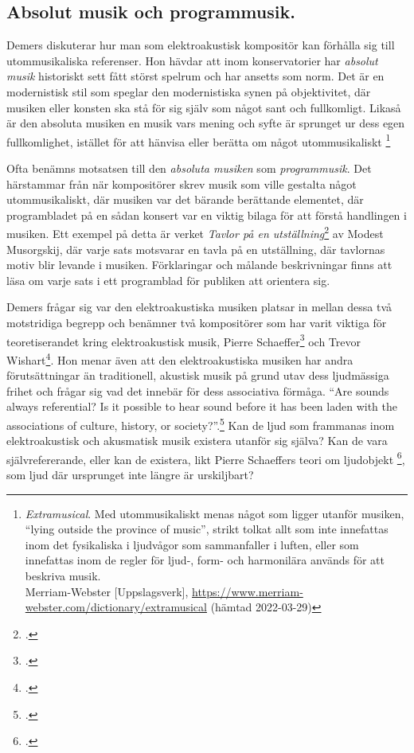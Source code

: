 \documentclass{article}
\begin{document}


\subsection{Absolut musik och programmusik.}
Demers diskuterar hur man som elektroakustisk kompositör kan förhålla sig till utommusikaliska referenser.
Hon hävdar att inom konservatorier har \emph{absolut musik} historiskt sett fått störst spelrum och har ansetts
som norm. Det är en modernistisk stil som speglar den modernistiska synen på objektivitet, där musiken eller
konsten ska stå för sig själv som något sant och fullkomligt. Likaså är den absoluta musiken en musik vars
mening och syfte är sprunget ur dess egen fullkomlighet, istället för att hänvisa eller berätta om något
utommusikaliskt \footnote{\emph{Extramusical}. Med utommusikaliskt menas något som ligger utanför musiken,
``lying outside the province of music'', strikt tolkat allt som inte innefattas inom det fysikaliska i
ljudvågor som sammanfaller i luften, eller som innefattas inom de regler för ljud-, form- och harmonilära
används för att beskriva musik. \\ Merriam-Webster [Uppslagsverk],
\url{https://www.merriam-webster.com/dictionary/extramusical} (hämtad 2022-03-29)}\nocite{webster}

Ofta benämns motsatsen till den \emph{absoluta musiken} som \emph{programmusik}. Det härstammar från när
kompositörer skrev musik som ville gestalta något utommusikaliskt, där musiken var det bärande berättande
elementet, där programbladet på en sådan konsert var en viktig bilaga för att förstå handlingen i musiken.
Ett exempel på detta är verket \emph{Tavlor på en utställning}\footcite{Tavlor} av Modest Musorgskij,
där varje sats motsvarar en tavla på en utställning, där tavlornas motiv blir levande i musiken. Förklaringar
och målande beskrivningar finns att läsa om varje sats i ett programblad för publiken att orientera sig.

Demers frågar sig var den elektroakustiska musiken platsar in mellan dessa två motstridiga begrepp och
benämner två kompositörer som har varit viktiga för teoretiserandet kring elektroakustisk musik, Pierre
Schaeffer\footcite{PierreSchaeffer} och Trevor Wishart\footcite{TrevorWishart}. Hon menar även att den
elektroakustiska musiken har andra förutsättningar än traditionell, akustisk musik på grund utav dess
ljudmässiga frihet och frågar sig vad det innebär för dess associativa förmåga. ``Are sounds always
referential? Is it possible to hear sound before it has been laden with the associations of culture, history,
or society?''.\footcite[23]{JoannaDemers} Kan de ljud som frammanas inom elektroakustisk och akusmatisk musik
existera utanför sig själva? Kan de vara självrefererande, eller kan de existera, likt Pierre Schaeffers teori
om ljudobjekt \footcite[271]{PierreSchaeffer}, som ljud där ursprunget inte längre är urskiljbart?
\end{document}
